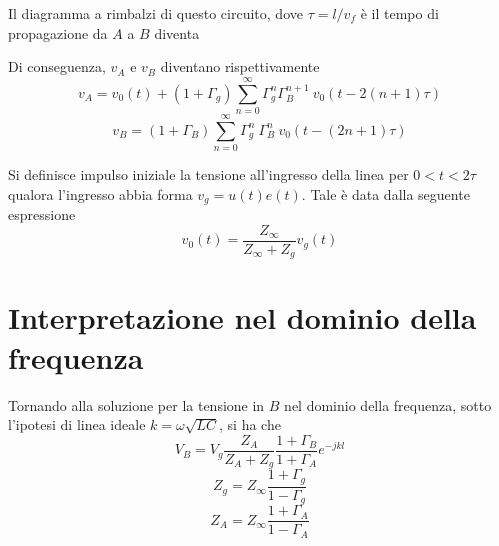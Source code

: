     Il diagramma a rimbalzi di questo circuito, dove $\tau = l/v_f$ è il tempo di propagazione da $A$ a $B$ diventa
    \begin{figure}[H]
        \centering
    \end{figure}

    Di conseguenza, $v_A$ e $v_B$ diventano rispettivamente
    \[
        v_A = v_0(t) + (1 + \Gamma_g) \sum_{n = 0}^{\infty} \Gamma_g^{n} \Gamma_B^{n + 1} \: v_0(t - 2(n + 1) \tau)
    \]
    \[
        v_B = (1 + \Gamma_B) \sum_{n = 0}^{\infty} \Gamma_g^{n} \: \Gamma_B^{n} \: v_0(t - (2n + 1) \tau)
    \]

    \begin{definition}
        Si definisce impulso iniziale la tensione all'ingresso della linea per $0 < t < 2 \tau$ qualora l'ingresso abbia forma $v_g = u(t) e(t)$.
        Tale è data dalla seguente espressione
        \[
            v_0(t) = \frac{Z_\infty}{Z_\infty + Z_g} v_g(t)
        \]
    \end{definition}


\section{Interpretazione nel dominio della frequenza}
    Tornando alla soluzione per la tensione in $B$ nel dominio della frequenza, sotto l'ipotesi di linea ideale $k = \omega \sqrt{LC}$, si ha che
    \[
        V_B = V_g \frac{Z_A}{Z_A + Z_g} \frac{1 + \Gamma_B}{1 + \Gamma_A} e^{-j k l}
    \]
    \[
        Z_g = Z_\infty \frac{1 + \Gamma_g}{1 - \Gamma_g}
    \]
    \[
        Z_A = Z_\infty \frac{1 + \Gamma_A}{1 - \Gamma_A}
    \]

